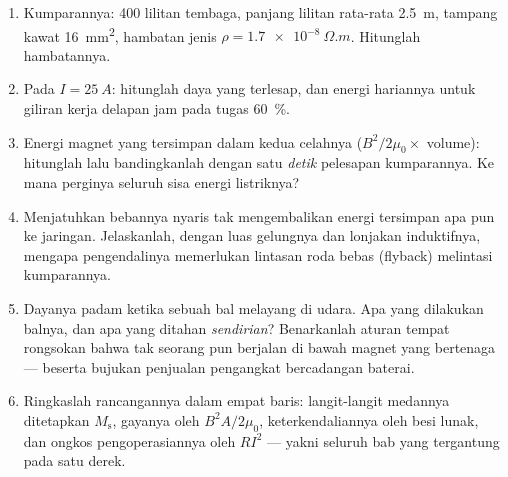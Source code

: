 \begin{problem}
\begin{enumerate}[resume]
  \item Kumparannya: 400 lilitan tembaga, panjang lilitan rata-rata
        \qty{2.5}{m}, tampang kawat \qty{16}{mm^2}, hambatan jenis
        $\rho = \qty{1.7e-8}{\Omega.m}$. Hitunglah hambatannya.
  \item Pada $I = \qty{25}{A}$: hitunglah daya yang terlesap, dan energi
        hariannya untuk giliran kerja delapan jam pada tugas \qty{60}{\percent}.
  \item Energi magnet yang tersimpan dalam kedua celahnya
        ($B^2/2\mu_0 \times$ volume): hitunglah lalu bandingkanlah dengan
        satu \emph{detik} pelesapan kumparannya. Ke mana perginya seluruh
        sisa energi listriknya?
  \item Menjatuhkan bebannya nyaris tak mengembalikan energi tersimpan
        apa pun ke jaringan. Jelaskanlah, dengan luas gelungnya dan
        lonjakan induktifnya, mengapa pengendalinya memerlukan lintasan
        roda bebas (flyback) melintasi kumparannya.
  \item Dayanya padam ketika sebuah bal melayang di udara. Apa yang
        dilakukan balnya, dan apa yang ditahan 
        \emph{sendirian}? Benarkanlah aturan tempat rongsokan bahwa tak
        seorang pun berjalan di bawah magnet yang bertenaga ---
        beserta bujukan penjualan pengangkat bercadangan baterai.
  \item Ringkaslah rancangannya dalam empat baris: langit-langit medannya
        ditetapkan $M_{\text{s}}$, gayanya oleh $B^2A/2\mu_0$,
        keterkendaliannya oleh  besi lunak, dan ongkos
        pengoperasiannya oleh $RI^2$ --- yakni seluruh bab yang
        tergantung pada satu derek.
\end{enumerate}
\end{problem}
